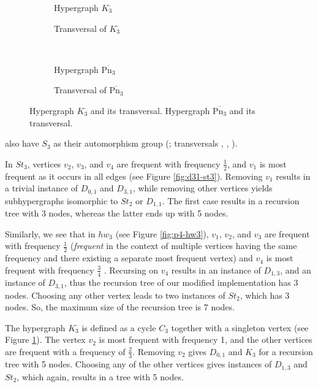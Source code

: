 \begin{figure}[tp]
\centering
\begin{subfigure}{0.45\linewidth}\centering\caption{Hypergraph $K_3^{\cdot}$}\end{subfigure}\hfill
\begin{subfigure}{0.45\linewidth}\centering\caption{Transversal of $K_3^{\cdot}$}\end{subfigure}\\[8pt]
\begin{subfigure}{0.45\linewidth}\centering\caption{Hypergraph $\overline{\text{Pn}_3}$}\end{subfigure}\hfill
\begin{subfigure}{0.45\linewidth}\centering\caption{Transversal of $\overline{\text{Pn}_3}$}\end{subfigure}
\caption{Hypergraph $K_3^{\cdot}$ and its transversal. Hypergraph $\overline{\text{Pn}_3}$ and its transversal.}\label{fig:k3dot-pn3bar}
\end{figure}

also have $S_3$ as their automorphism group (; transversals , , ).

In $St_3$, vertices $v_2$, $v_3$, and $v_4$ are frequent with frequency $\frac{1}{2}$, and $v_1$ is most frequent as it occurs in all edges (see Figure \ref{fig:d31-st3}). Removing $v_1$ results in a trivial instance of $D_{0,1}$ and $D_{3,1}$, while removing other vertices yields subhypergraphs isomorphic to $St_2$ or $D_{1,1}$. The first case results in a recursion tree with 3 nodes, whereas the latter ends up with 5 nodes.

Similarly, we see that in $hw_3$ (see Figure \ref{fig:p4-hw3}), $v_1$, $v_2$, and $v_3$ are frequent with frequency $\frac{1}{2}$ (\emph{frequent} in the context of multiple vertices having the same frequency and there existing a separate most frequent vertex) and $v_4$ is most frequent with frequency $\frac{3}{4}$ . Recursing on $v_4$ results in an instance of $D_{1,3}$, and an instance of $D_{3,1}$, thus the recursion tree of our modified implementation has 3 nodes. Choosing any other vertex leads to two instances of $St_2$, which has 3 nodes. So, the maximum size of the recursion tree is 7 nodes.

The hypergraph $K_3^{\cdot}$ is defined as a cycle $C_3$ together with a singleton vertex (see Figure \ref{fig:k3dot-pn3bar}). The vertex $v_2$ is most frequent with frequency 1, and the other vertices are frequent with a frequency of $\frac{2}{3}$. Removing $v_2$ gives $D_{0,1}$ and $K_3$ for a recursion tree with 5 nodes. Choosing any of the other vertices gives instances of $D_{1,3}$ and $St_2$, which again, results in a tree with 5 nodes.

